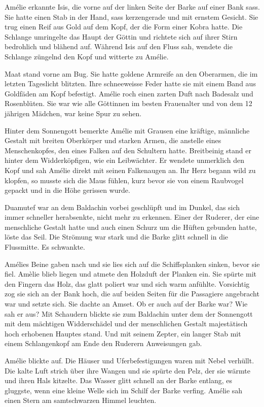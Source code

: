\documentclass[11pt,titlepage,a5paper]{book}
\begin{document}
Amélie erkannte Isis, die vorne auf der linken Seite der Barke auf einer Bank sass. Sie hatte einen Stab in der Hand, sass kerzengerade und mit ernstem Gesicht. Sie trug einen Reif aus Gold auf dem Kopf, der die Form einer Kobra hatte. Die Schlange umringelte das Haupt der Göttin und richtete sich auf ihrer Stirn bedrohlich und blähend auf. Während Isis auf den Fluss sah, wendete die Schlange züngelnd den Kopf und witterte zu Amélie. 

Maat stand vorne am Bug. Sie hatte goldene Armreife an den Oberarmen, die im letzten Tageslicht blitzten. Ihre schneeweisse Feder hatte sie mit einem Band aus Goldfäden am Kopf befestigt. Amélie roch einen zarten Duft nach Badesalz und Rosenblüten. Sie war wie alle Göttinnen im besten Frauenalter und von dem 12 jährigen Mädchen, war keine Spur zu sehen. 

Hinter dem Sonnengott bemerkte Amélie mit Grausen eine kräftige, männliche Gestalt mit breiten Oberkörper und starken Armen, die anstelle eines Menschenkopfes, den eines Falken auf den Schultern hatte. Breitbeinig stand er hinter dem Widderköpfigen, wie ein Leibwächter. Er wendete unmerklich den Kopf und sah Amélie direkt mit seinen Falkenaugen an. Ihr Herz begann wild zu klopfen, so musste sich die Maus fühlen, kurz bevor sie von einem Raubvogel gepackt und in die Höhe gerissen wurde.  

Duamutef war an dem Baldachin vorbei geschlüpft und im Dunkel, das sich immer schneller herabsenkte, nicht mehr zu erkennen. Einer der Ruderer, der eine menschliche Gestalt hatte und auch einen Schurz um die Hüften gebunden hatte, löste das Seil. Die Strömung war stark und die Barke glitt schnell in die Flussmitte. Es schwankte.

Amélies Beine gaben nach und sie lies sich auf die Schiffsplanken sinken, bevor sie fiel. Amèlie blieb liegen und atmete den Holzduft der Planken ein. Sie spürte mit den Fingern das Holz, das glatt poliert war und sich warm anfühlte. Vorsichtig zog sie sich an der Bank hoch, die auf beiden Seiten für die Passagiere angebracht war und setzte sich. Sie dachte an Amset. Ob er auch auf der Barke war? Wie sah er aus? Mit Schaudern blickte sie zum Baldachin unter dem der Sonnengott mit dem mächtigen Widderschädel und der menschlichen Gestalt majestätisch hoch erhobenen Hauptes stand.  Und mit seinem Zepter, ein langer Stab mit einem Schlangenkopf am Ende den Ruderern Anweisungen gab.

Amélie blickte auf. Die Häuser und Uferbefestigungen waren mit Nebel verhüllt. Die kalte Luft strich über ihre Wangen und sie spürte den Pelz, der sie wärmte und ihren Hals kitzelte. Das Wasser glitt schnell an der Barke entlang, es gluggste, wenn eine kleine Welle sich im Schilf der Barke verfing. Amélie sah einen Stern am samtschwarzen Himmel leuchten. 
\end{document}
